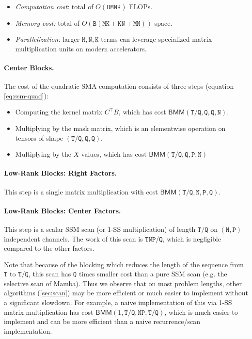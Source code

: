 \begin{itemize}
  \item \emph{Computation cost}: total of $O(\mathtt{BMNK})$ FLOPs.
  \item \emph{Memory cost:} total of $O(\mathtt{B}(\mathtt{MK}+\mathtt{KN}+\mathtt{MN}))$ space.
  \item \emph{Parallelization:} larger $\mathtt{M}, \mathtt{N}, \mathtt{K}$ terms can leverage specialized matrix multiplication units on modern accelerators.
\end{itemize}

\paragraph{Center Blocks.} The cost of the quadratic SMA computation consists of three steps (equation \eqref{eq:ssm-quad}):

\begin{itemize}
  \item Computing the kernel matrix $C^{\top} B$, which has cost $\mathsf{BMM}(\mathtt{T}/\mathtt{Q}, \mathtt{Q}, \mathtt{Q}, \mathtt{N})$.
  \item Multiplying by the mask matrix, which is an elementwise operation on tensors of shape $(\mathtt{T}/\mathtt{Q}, \mathtt{Q}, \mathtt{Q})$.
  \item Multiplying by the $X$ values, which has cost $\mathsf{BMM}(\mathtt{T}/\mathtt{Q}, \mathtt{Q}, \mathtt{P}, \mathtt{N})$
\end{itemize}

\paragraph{Low-Rank Blocks: Right Factors.} This step is a single matrix multiplication with cost $\mathsf{BMM}(\mathtt{T}/\mathtt{Q}, \mathtt{N}, \mathtt{P}, \mathtt{Q})$.

\paragraph{Low-Rank Blocks: Center Factors.} This step is a scalar SSM scan (or 1-SS multiplication) of length $\mathtt{T}/\mathtt{Q}$ on $(\mathtt{N}, \mathtt{P})$ independent channels. The work of this scan is $\mathtt{TNP}/\mathtt{Q}$, which is negligible compared to the other factors.

Note that because of the blocking which reduces the length of the sequence from $\mathtt{T}$ to $\mathtt{T}/\mathtt{Q}$,
this scan has $\mathtt{Q}$ times smaller cost than a pure SSM scan (e.g. the selective scan of Mamba). Thus we observe that on most problem lengths, other algorithms (\ref{sec:scan}) may be more efficient or much easier to implement without a significant slowdown. For example, a naive implementation of this via 1-SS matrix multiplication has cost $\mathsf{BMM}(1, \mathtt{T}/\mathtt{Q}, \mathtt{NP}, \mathtt{T}/\mathtt{Q})$,
which is much easier to implement and can be more efficient than a naive recurrence/scan implementation.

